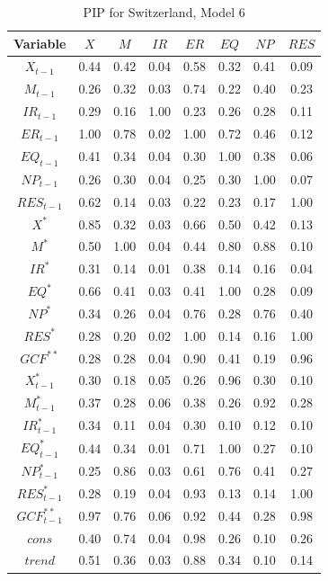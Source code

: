 \documentclass[a4paper, twoside]{templates/ociamthesis}
\begin{document}
\begin{table}[!ht]

\caption{\label{tab:TablePIPCH6}PIP for Switzerland, Model 6}
\centering
\fontsize{8}{10}\selectfont
\begin{tabular}[t]{cccccccc}
\toprule
Variable & $X$ & $M$ & $IR$ & $ER$ & $EQ$ & $NP$ & $RES$\\
\midrule
$X_{t-1}$ & 0.44 & 0.42 & 0.04 & 0.58 & 0.32 & 0.41 & 0.09\\
$M_{t-1}$ & 0.26 & 0.32 & 0.03 & 0.74 & 0.22 & 0.40 & 0.23\\
$IR_{t-1}$ & 0.29 & 0.16 & 1.00 & 0.23 & 0.26 & 0.28 & 0.11\\
$ER_{t-1}$ & 1.00 & 0.78 & 0.02 & 1.00 & 0.72 & 0.46 & 0.12\\
$EQ_{t-1}$ & 0.41 & 0.34 & 0.04 & 0.30 & 1.00 & 0.38 & 0.06\\
$NP_{t-1}$ & 0.26 & 0.30 & 0.04 & 0.25 & 0.30 & 1.00 & 0.07\\
$RES_{t-1}$ & 0.62 & 0.14 & 0.03 & 0.22 & 0.23 & 0.17 & 1.00\\
$X^*$ & 0.85 & 0.32 & 0.03 & 0.66 & 0.50 & 0.42 & 0.13\\
$M^*$ & 0.50 & 1.00 & 0.04 & 0.44 & 0.80 & 0.88 & 0.10\\
$IR^*$ & 0.31 & 0.14 & 0.01 & 0.38 & 0.14 & 0.16 & 0.04\\
$EQ^*$ & 0.66 & 0.41 & 0.03 & 0.41 & 1.00 & 0.28 & 0.09\\
$NP^*$ & 0.34 & 0.26 & 0.04 & 0.76 & 0.28 & 0.76 & 0.40\\
$RES^*$ & 0.28 & 0.20 & 0.02 & 1.00 & 0.14 & 0.16 & 1.00\\
$GCF^{**}$ & 0.28 & 0.28 & 0.04 & 0.90 & 0.41 & 0.19 & 0.96\\
$X^*_{t-1}$ & 0.30 & 0.18 & 0.05 & 0.26 & 0.96 & 0.30 & 0.10\\
$M^*_{t-1}$ & 0.37 & 0.28 & 0.06 & 0.38 & 0.26 & 0.92 & 0.28\\
$IR^*_{t-1}$ & 0.34 & 0.11 & 0.04 & 0.30 & 0.10 & 0.12 & 0.10\\
$EQ^*_{t-1}$ & 0.44 & 0.34 & 0.01 & 0.71 & 1.00 & 0.27 & 0.10\\
$NP^*_{t-1}$ & 0.25 & 0.86 & 0.03 & 0.61 & 0.76 & 0.41 & 0.27\\
$RES^*_{t-1}$ & 0.28 & 0.19 & 0.04 & 0.93 & 0.13 & 0.14 & 1.00\\
$GCF^{**}_{t-1}$ & 0.97 & 0.76 & 0.06 & 0.92 & 0.44 & 0.28 & 0.98\\
$cons$ & 0.40 & 0.74 & 0.04 & 0.98 & 0.26 & 0.10 & 0.26\\
$trend$ & 0.51 & 0.36 & 0.03 & 0.88 & 0.34 & 0.10 & 0.14\\
\bottomrule
\end{tabular}
\end{table}
\end{document}
